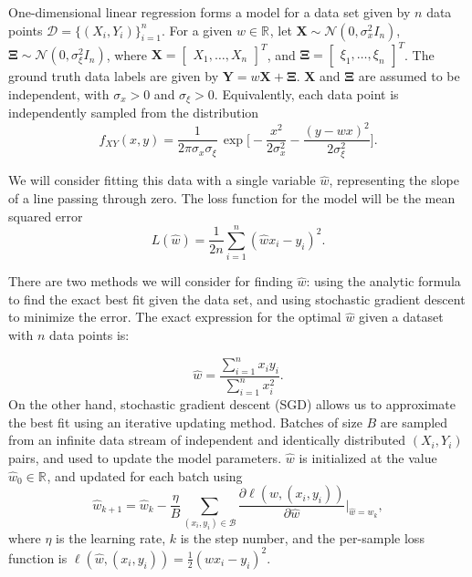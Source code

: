 \documentclass[12pt,onecolumn, margin=1in]{IEEEtran}
\newcommand{\paren}[1]{\left( #1 \right)}
\newcommand{\R}[1]{\mathbb{R}^{#1}}
\newcommand{\gauss}[2]{\mathcal{N}\paren{#1, #2}}
\newcommand{\bX}{\boldsymbol{X}}
\newcommand{\bY}{\boldsymbol{Y}}
\newcommand{\bXi}{\boldsymbol{\Xi}}
\newcommand{\wh}{\hat{w}}
\newcommand{\sigx}{\sigma_x}
\newcommand{\sigxi}{\sigma_\xi}
\begin{document}
One-dimensional linear regression forms a model for a data set given by $n$ data points $\mathcal{D} = \{(X_i,Y_i)\}_{i=1}^n$. For a given $w \in \R{}$, let $\bX \sim \gauss{0}{\sigx^2I_n}$, $\bXi \sim \gauss{0}{\sigxi^2 I_n}$, where $\bX = \begin{bmatrix}X_1, \dots, X_n \end{bmatrix}^T$, and $\bXi = \begin{bmatrix}\xi_1, \dots, \xi_n \end{bmatrix}^T$. The ground truth data labels are given by $\bY = w\bX + \bXi$. $\boldsymbol{X}$ and $\boldsymbol{\Xi}$
are assumed to be independent, with $\sigx > 0$ and $\sigxi > 0$. 
Equivalently, each data point is independently sampled from the distribution 
\begin{equation}\label{eq:initial_dist}
    f_{XY}(x,y) = \frac{1}{2\pi\sigma_x \sigma_\xi} \, \exp \bigg[-\frac{x^2}{2\sigma_x^2} - \frac{(y-wx)^2}{2\sigma_\xi^2} \bigg].
\end{equation}


We will consider fitting this data with a single variable $\hat w$, representing the slope of a line passing through zero. The loss function for the model will be the mean squared error
\begin{equation}
    \label{eq:loss}
    L(\wh) = \frac{1}{2n} \sum^n_{i = 1}(\hat w x_i - y_i)^2.
\end{equation}

There are two methods we will consider for finding $\hat w$: using the analytic formula to find the exact best fit given the data set, and using stochastic gradient descent to minimize the error. The exact expression for the optimal $\hat w$ given a dataset with $n$ data points is:

\begin{equation}
    \label{eq:exact_formula}
    \hat{w} = \frac{\sum^n_{i=1} x_iy_i}{\sum^n_{i=1} x_i^2}.
\end{equation}
On the other hand, stochastic gradient descent (SGD) allows us to approximate the best fit using an iterative updating method. Batches of size $B$ are sampled from an infinite data stream of independent and identically distributed $(X_i, Y_i)$ pairs, and used to update the model parameters. $\hat w$ is initialized at the value $\hat w_0 \in \R{}$, and updated for each batch using
\begin{equation}
    \label{eq:SGD_update}
    \wh_{k + 1} = \wh_k - \frac{\eta}{B} \sum_{(x_i, y_i) \in \mathcal{B}} \frac{\partial \ell(\wh, (x_i, y_i))}{\partial \wh} \bigg |_{\wh = \wh_k},
\end{equation}
where $\eta$ is the learning rate, $k$ is the step number, and the per-sample loss function is $\ell(\wh, (x_i, y_i)) = \frac{1}{2}(\wh x_i - y_i)^2$. 
\end{document}
